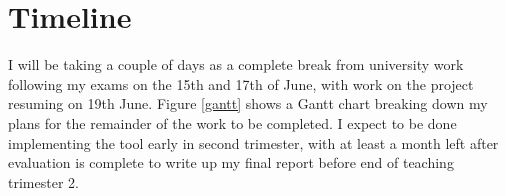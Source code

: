\section{Timeline}

I will be taking a couple of days as a complete break from university work following my exams on the 15th and 17th of June, with work on the project resuming on 19th June. Figure \ref{gantt} shows a Gantt chart breaking down my plans for the remainder of the work to be completed.  I expect to be done implementing the tool early in second trimester, with at least a month left after evaluation is complete to write up my final report before end of teaching trimester 2.
  
\begin{figure}[tbh]
\end{figure}
